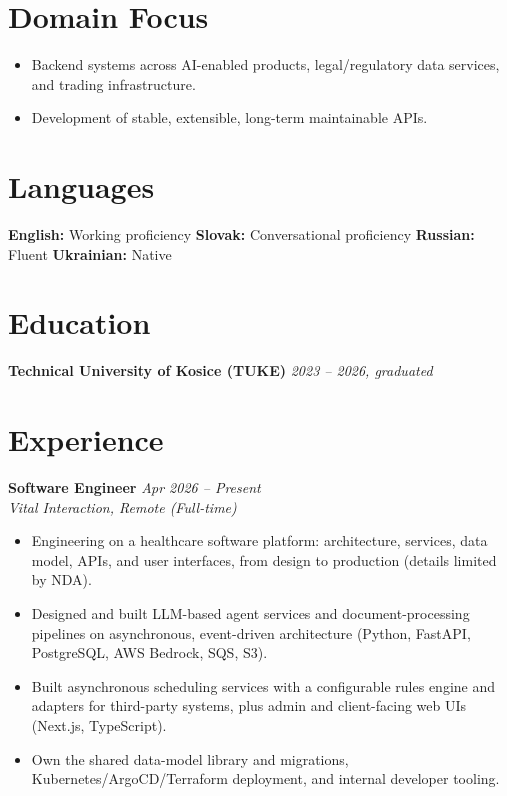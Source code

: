 \documentclass[11pt,a4paper]{article}
\begin{document}
\section*{Domain Focus}
\begin{itemize}[itemsep=0.08em,topsep=0.08em]
  \item Backend systems across AI-enabled products, legal/regulatory data services, and trading infrastructure.
  \item Development of stable, extensible, long-term maintainable APIs.
\end{itemize}

\section*{Languages}
\textbf{English:} Working proficiency \hspace{0.6em}
\textbf{Slovak:} Conversational proficiency \hspace{0.6em}
\textbf{Russian:} Fluent \hspace{0.6em}
\textbf{Ukrainian:} Native

\section*{Education}
\textbf{Technical University of Kosice (TUKE)} \hfill \textit{2023 -- 2026, graduated}

\section*{Experience}
\textbf{Software Engineer} \hfill \textit{Apr 2026 -- Present} \\
\textit{Vital Interaction, Remote (Full-time)}
\begin{itemize}
  \item Engineering on a healthcare software platform: architecture, services, data model, APIs, and user interfaces, from design to production (details limited by NDA).
  \item Designed and built LLM-based agent services and document-processing pipelines on asynchronous, event-driven architecture (Python, FastAPI, PostgreSQL, AWS Bedrock, SQS, S3).
  \item Built asynchronous scheduling services with a configurable rules engine and adapters for third-party systems, plus admin and client-facing web UIs (Next.js, TypeScript).
  \item Own the shared data-model library and migrations, Kubernetes/ArgoCD/Terraform deployment, and internal developer tooling.
\end{itemize}
\end{document}
